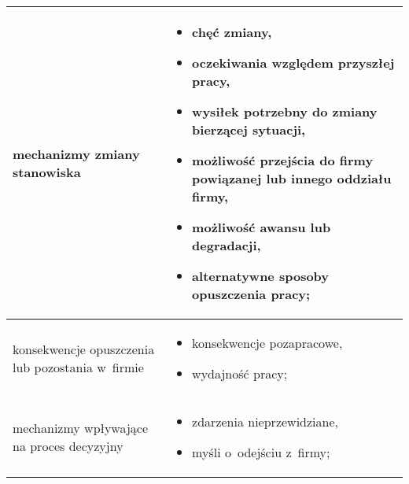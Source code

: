 \begin{minipage}{\textwidth}
\begin{table}[H]
\begin{center}
\begin{tabular}{|P{.2\textwidth}|P{.7\textwidth}|}
                         mechanizmy zmiany stanowiska &
                         \begin{itemize}
                             \item chęć zmiany,
                             \item oczekiwania względem przyszłej pracy,
                             \item wysiłek potrzebny do zmiany bierzącej sytuacji,
                             \item możliwość przejścia do firmy powiązanej lub innego oddziału firmy,
                             \item możliwość awansu lub degradacji,
                             \item alternatywne sposoby opuszczenia pracy;
                         \end{itemize} \\
                         \hline

                         konsekwencje opuszczenia lub pozostania w~firmie &
                         \begin{itemize}
                             \item konsekwencje pozapracowe,
                             \item wydajność pracy;
                         \end{itemize} \\
                         \hline

                         mechanizmy wpływające na proces decyzyjny &
                         \begin{itemize}
                             \item zdarzenia nieprzewidziane,
                             \item myśli o~odejściu z~firmy;
                         \end{itemize} \\
                         \hline
                     \end{tabular}
                 \end{center}
                 \raggedright{}
                 \vspace{0.75cm}
             \end{table}
\end{minipage}

